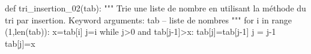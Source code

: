 \documentclass[10pt,fleqn]{article} %
\newcommand{\tsf}[1]{\small{\texttt{#1}}}
\begin{document}
\begin{py}
\begin{python}
def tri_insertion_02(tab):
    """ 
    Trie une liste de nombre en utilisant la méthode du tri par insertion.
    Keyword arguments:
    tab -- liste de nombres
    """
    for i in range (1,len(tab)):
        x=tab[i]
        j=i
        while j>0 and tab[j-1]>x:
            tab[j]=tab[j-1]
            j = j-1
        tab[j]=x
\end{python}
\end{py}
\end{document}
